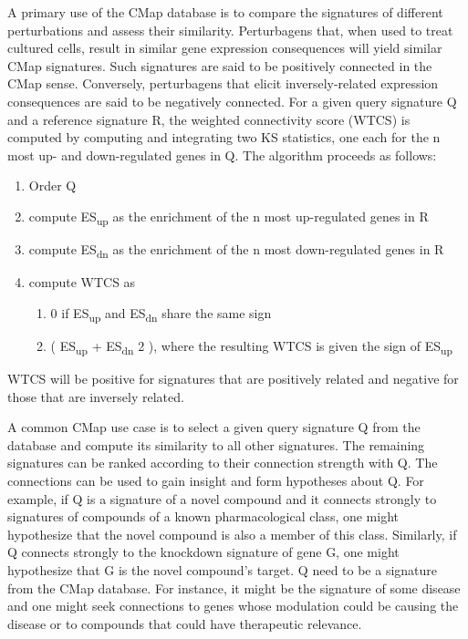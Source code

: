 \documentclass[12pt]{article}
\begin{document}
A primary use of the CMap database is to compare the signatures of different perturbations and assess their similarity. Perturbagens that, when used to treat cultured cells, result in similar gene expression consequences will yield similar CMap signatures. Such signatures are said to be positively connected in the CMap sense. Conversely, perturbagens that elicit inversely-related expression consequences are said to be negatively connected. For a given query signature Q and a reference signature R, the weighted connectivity score (WTCS) is computed by computing and integrating two KS statistics, one each for the n most up- and down-regulated genes in Q. The algorithm proceeds as follows:
\begin{enumerate}
\item Order Q
\item compute ES\textsubscript{up} as the enrichment of the n most up-regulated genes in R
\item compute ES\textsubscript{dn} as the enrichment of the n most down-regulated genes in R
\item compute WTCS as 
\begin{enumerate}
	\item 0 if ES\textsubscript{up} and ES\textsubscript{dn} share the same sign
	\item ( \lvert ES\textsubscript{up} \rvert + \lvert ES\textsubscript{dn} \rvert \/ 2 ), where the resulting WTCS is given the sign of ES\textsubscript{up}
\end{enumerate}
\end{enumerate}

WTCS will be positive for signatures that are positively related and negative for those that are inversely related.

A common CMap use case is to select a given query signature Q from the database and compute its similarity to all other signatures. The remaining signatures can be ranked according to their connection strength with Q. The connections can be used to gain insight and form hypotheses about Q. For example, if Q is a signature of a novel compound and it connects strongly to signatures of compounds of a known pharmacological class, one might hypothesize that the novel compound is also a member of this class. Similarly, if Q connects strongly to the knockdown signature of gene G, one might hypothesize that G is the novel compound's target. Q need to be a signature from the CMap database. For instance, it might be the signature of some disease and one might seek connections to genes whose modulation could be causing the disease or to compounds that could have therapeutic relevance. 
\end{document}
